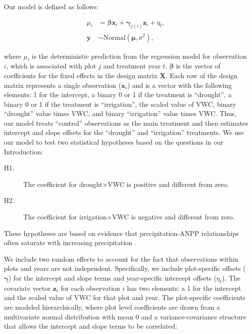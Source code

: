 \documentclass[fleqn,10pt,lineno]{wlpeerj} %
\begin{document}
Our model is defined as follows:

\vspace{-2em}

\begin{align}
\mu_{i} &= \boldsymbol{\beta}\textbf{x}_i + \boldsymbol{\gamma}_{j(i)}\textbf{z}_i + \eta_t, \\
\textbf{y} &\sim \text{Normal} \left(\boldsymbol{\mu}, \sigma^2 \right),
\end{align}

\noindent{}where \(\mu_{i}\) is the deterministic prediction from the
regression model for observation \(i\), which is associated with plot
\(j\) and treatment year \(t\). \(\boldsymbol{\beta}\) is the vector of
coefficients for the fixed effects in the design matrix \(\textbf{X}\).
Each row of the design matrix represents a single observation
(\(\textbf{x}_i\)) and is a vector with the following elements: 1 for
the intercept, a binary 0 or 1 if the treatment is ``drought'', a binary
0 or 1 if the treatment is ``irrigation'', the scaled value of VWC,
binary ``drought'' value times VWC, and binary ``irrigation'' value
times VWC. Thus, our model treats ``control'' observations as the main
treatment and then estimates intercept and slope offsets for the
``drought'' and ``irrigation'' treatments. We use our model to test two
statistical hypotheses based on the questions in our Introduction:

\begin{description}
\item [H1.] The coefficient for drought$\times$VWC is positive and different from zero.
\item [H2.] The coefficient for irrigation$\times$VWC is negative and different from zero.
\end{description}

\noindent{}These hypotheses are based on evidence that
precipitation-ANPP relationships often saturate with increasing
precipitation \citep{Hsu2012, Gherardi2015a}.

We include two random effects to account for the fact that observations
within plots and years are not independent. Specifically, we include
plot-specific offsets (\(\boldsymbol{\gamma}\)) for the intercept and
slope terms and year-specific intercept offsets (\(\eta_t\)). The
covariate vector \(\textbf{z}_i\) for each observation \(i\) has two
elements: a 1 for the intercept and the scaled value of VWC for that
plot and year. The plot-specific coefficients are modeled
hierarchically, where plot level coefficients are drawn from a
multivariate normal distribution with mean 0 and a variance-covariance
structure that allows the intercept and slope terms to be correlated:
\end{document}
